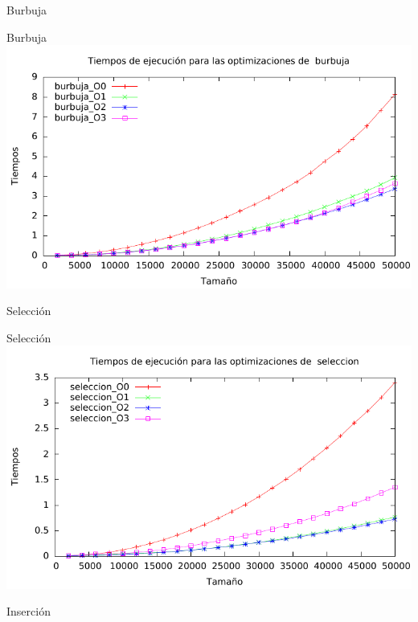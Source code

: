 \documentclass[10pt,compress,usetitleprogressbar,mathserif]{beamer}
\begin{document}
\begin{frame}{Burbuja}
	
\end{frame}

\begin{frame}{Burbuja}
	\includegraphics[width = \textwidth ]{img/burbuja_optim_g.pdf}
\end{frame}

\begin{frame}{Selección}
	
\end{frame}

\begin{frame}{Selección}
	\includegraphics[width = \textwidth ]{img/seleccion_optim_g.pdf}
\end{frame}

\begin{frame}{Inserción}
	
\end{frame}
\end{document}

